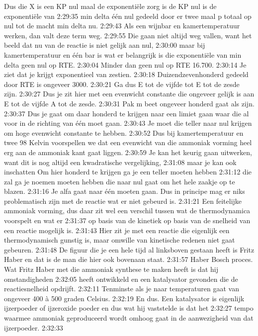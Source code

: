 Dus die X is een KP nul maal de exponentiële zorg is de KP nul is de exponentiële van
2:29:35
min delta één nul gedeeld door er twee maal p totaal op nul tot de macht min delta nu.
2:29:43
Als een wijnbar en kamertemperatuur werken, dan valt deze term weg.
2:29:55
Die gaan niet altijd weg vallen, want het beeld dat nu van de reactie is niet gelijk aan nul,
2:30:00
maar bij kamertemperatuur en één bar is wat er belangrijk is die exponentiële van min delta geen nul op RTE.
2:30:04
Minder dan geen nul op RTE 16.700.
2:30:14
Je ziet dat je krijgt exponentieel van zestien.
2:30:18
Duizendzevenhonderd gedeeld door RTE is ongeveer 3000.
2:30:21
Ga dus E tot de vijfde tot E tot de zesde zijn.
2:30:27
Dus je zit hier met een evenwicht constante die ongeveer gelijk is aan E tot de vijfde A tot de zesde.
2:30:31
Pak m beet ongeveer honderd gaat als zijn.
2:30:37
Dus je gaat om daar honderd te krijgen naar een limiet gaan waar die al voor in de richting van één moet gaan.
2:30:43
Je moet die teller naar nul krijgen om hoge evenwicht constante te hebben.
2:30:52
Dus bij kamertemperatuur en twee 98 Kelvin voorspellen we dat een evenwicht van die ammoniak vorming heel erg aan de ammoniak kant gaat liggen.
2:30:59
Je kan het keurig gaan uitwerken, want dit is nog altijd een kwadratische vergelijking,
2:31:08
maar je kan ook inschatten Om hier honderd te krijgen ga je een teller moeten hebben
2:31:12
die zal ga je noemen moeten hebben die naar nul gaat om het hele zaakje op te blazen.
2:31:16
Je alfa gaat naar één moeten gaan. Dus in principe mag er niks problematisch zijn met de reactie wat er niet gebeurd is.
2:31:21
Een feitelijke ammoniak vorming, dus daar zit wel een verschil tussen wat de thermodynamica voorspelt en wat er
2:31:37
op basis van de kinetiek op basis van de snelheid van een reactie mogelijk is.
2:31:43
Hier zit je met een reactie die eigenlijk een thermodynamisch gunstig is, maar omwille van kinetische redenen niet gaat gebeuren.
2:31:48
De figuur die je een hele tijd al linksboven gestaan heeft is Fritz Haber en dat is de man die hier ook bovenaan staat.
2:31:57
Haber Bosch proces. Wat Fritz Haber met die ammoniak synthese te maken heeft is dat hij omstandigheden
2:32:05
heeft ontwikkeld en een katalysator gevonden die de reactiesnelheid opdrijft.
2:32:11
Tenminste als je naar temperaturen gaat van ongeveer 400 à 500 graden Celsius.
2:32:19
En dus. Een katalysator is eigenlijk ijzerpoeder of ijzeroxide poeder en dus wat hij vaststelde is dat het
2:32:27
tempo waarmee ammoniak geproduceerd wordt omhoog gaat in de aanwezigheid van dat ijzerpoeder.
2:32:33
